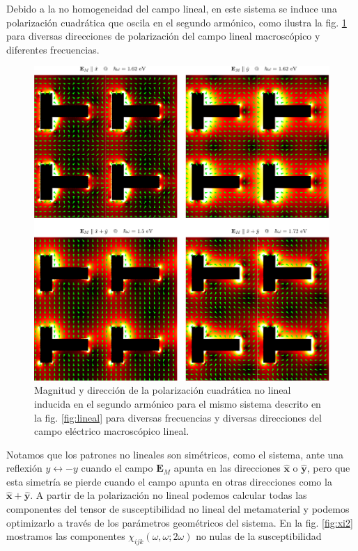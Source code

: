 \documentclass[12pt]{article}
\begin{document}
Debido a la no homogeneidad del campo lineal, en este sistema se
induce una polarización cuadrática que oscila en el segundo armónico,
como ilustra la fig. \ref{fig:P2} para diversas direcciones de
polarización del campo lineal macroscópico y diferentes frecuencias.
\begin{figure}
  \centering
  \includegraphics[width=\textwidth]{figshg6}
  \caption{Magnitud y dirección de la polarización cuadrática no
    lineal inducida en el segundo armónico para el mismo sistema
    descrito en la fig. \ref{fig:lineal} para diversas frecuencias y
    diversas direcciones del campo eléctrico macroscópico lineal.}
  \label{fig:P2}
\end{figure}
Notamos que los patrones no lineales son simétricos, como el sistema,
ante una reflexión $y\leftrightarrow -y$ cuando el campo $\bm E_M$
apunta en las direcciones $\hat{\bm x}$ o $\hat{\bm y}$, pero que esta simetría se pierde
cuando el campo apunta en otras direcciones como la $\hat{\bm
  x}+\hat{\bm y}$.
A partir de la polarización no lineal podemos calcular todas las
componentes del tensor de susceptibilidad no lineal del metamaterial y
podemos optimizarlo a través de los parámetros geométricos del
sistema. En la fig. \ref{fig:xi2} mostramos las componentes
$\chi_{ijk}(\omega,\omega;2\omega)$ no nulas de la susceptibilidad
\end{document}
